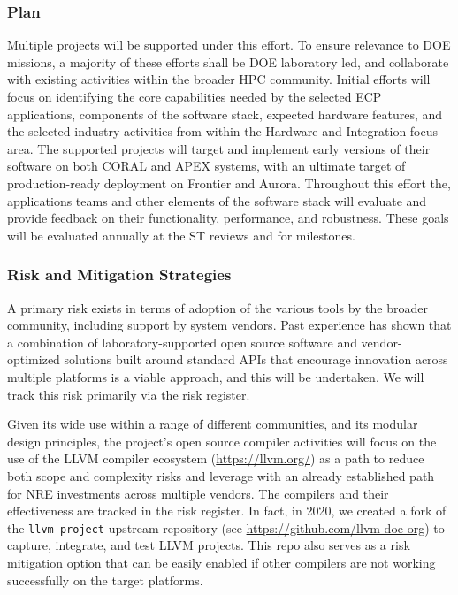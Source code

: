 \subsubsection{Plan}
Multiple projects will be supported under this effort. To ensure relevance to DOE missions, a majority of these efforts shall be DOE laboratory led, and collaborate with existing activities within the broader HPC community. 
Initial efforts will focus on identifying the core capabilities needed by the selected ECP applications, components of the software stack, expected hardware features, and the selected industry activities from within the Hardware and Integration focus area. 
The supported projects will target and implement early versions of their software on both CORAL and APEX systems, with an ultimate target of production-ready deployment on Frontier and Aurora. 
Throughout this effort the, applications teams and other elements of the software stack will evaluate and provide feedback on their functionality, performance, and robustness. 
These goals will be evaluated annually at the ST reviews and for milestones.

\subsubsection{Risk and Mitigation Strategies}

A primary risk exists in terms of adoption of the various tools by the broader community, including support by system vendors. Past experience has shown that a combination of laboratory-supported open source software and vendor-optimized solutions built around standard APIs that encourage innovation across multiple platforms is a viable approach, and this will be undertaken. 
We will track this risk primarily via the risk register.

Given its wide use within a range of different communities, and its modular design principles, the project's open source compiler activities will focus on the use of the LLVM compiler ecosystem (\url{https://llvm.org/}) as a path to reduce both scope and complexity risks and leverage with an already established path for NRE investments across multiple vendors. 
The compilers and their effectiveness are tracked in the risk register. 
%
In fact, in 2020, we created a fork of the \texttt{llvm-project} upstream repository (see \url{https://github.com/llvm-doe-org}) to capture, integrate, and test LLVM projects. This repo also serves as a risk mitigation option that can be easily enabled if other compilers are not working successfully on the target platforms.

